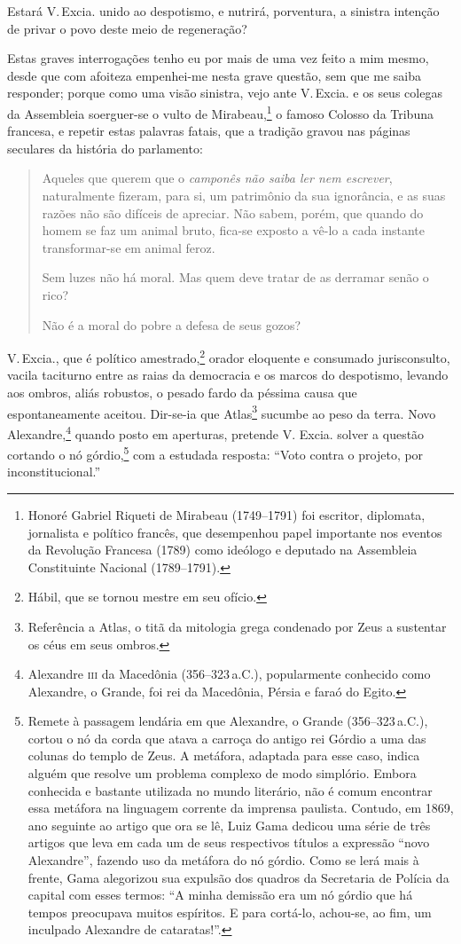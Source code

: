 Estará V.\,Excia. unido ao despotismo, e nutrirá, porventura, a sinistra
intenção de privar o povo deste meio de regeneração?

Estas graves interrogações tenho eu por mais de uma vez feito a mim
mesmo, desde que com afoiteza empenhei-me nesta grave questão, sem que
me saiba responder; porque como uma visão sinistra, vejo ante V.\,Excia.
e os seus colegas da Assembleia soerguer-se o vulto de
Mirabeau,\footnote{Honoré Gabriel Riqueti de Mirabeau (1749--1791) foi
  escritor, diplomata, jornalista e político francês, que desempenhou
  papel importante nos eventos da Revolução Francesa (1789) como
  ideólogo e deputado na Assembleia Constituinte Nacional (1789--1791).}
o famoso Colosso da Tribuna francesa, e repetir estas palavras fatais,
que a tradição gravou nas páginas seculares da história do parlamento:

\begin{quote}
Aqueles que querem que o \emph{camponês não saiba ler nem escrever},
naturalmente fizeram, para si, um patrimônio da sua ignorância, e as
suas razões não são difíceis de apreciar. Não sabem, porém, que quando
do homem se faz um animal bruto, fica-se exposto a vê-lo a cada instante
transformar-se em animal feroz.

Sem luzes não há moral. Mas quem deve tratar de as derramar senão o
rico?

Não é a moral do pobre a defesa de seus gozos?
\end{quote}

V.\,Excia., que é político amestrado,\footnote{Hábil, que se tornou
  mestre em seu ofício.} orador eloquente e consumado jurisconsulto,
vacila taciturno entre as raias da democracia e os marcos do despotismo,
levando aos ombros, aliás robustos, o pesado fardo da péssima causa que
espontaneamente aceitou. Dir-se-ia que Atlas\footnote{Referência a
  Atlas, o titã da mitologia grega condenado por Zeus a sustentar os
  céus em seus ombros.} sucumbe ao peso da terra. Novo
Alexandre,\footnote{Alexandre \textsc{iii} da Macedônia (356--323\,a.C.),
  popularmente conhecido como Alexandre, o Grande, foi rei da Macedônia,
  Pérsia e faraó do Egito.} quando posto em aperturas, pretende V.
Excia. solver a questão cortando o nó górdio,\footnote{Remete à
  passagem lendária em que Alexandre, o Grande (356--323\,a.C.), cortou o
  nó da corda que atava a carroça do antigo rei Górdio a uma das colunas
  do templo de Zeus. A metáfora, adaptada para esse caso, indica alguém
  que resolve um problema complexo de modo simplório. Embora conhecida e
  bastante utilizada no mundo literário, não é comum encontrar essa
  metáfora na linguagem corrente da imprensa paulista. Contudo, em 1869,
  ano seguinte ao artigo que ora se lê, Luiz Gama dedicou uma série de
  três artigos que leva em cada um de seus respectivos títulos a
  expressão ``novo Alexandre'', fazendo uso da metáfora do nó górdio. Como
  se lerá mais à frente, Gama alegorizou sua expulsão dos quadros da
  Secretaria de Polícia da capital com esses termos: ``A minha demissão
  era um nó górdio que há tempos preocupava muitos espíritos. E para
  cortá-lo, achou-se, ao fim, um inculpado Alexandre de cataratas!''.\label{gordio}}
com a estudada resposta: ``Voto contra o projeto, por inconstitucional.''

